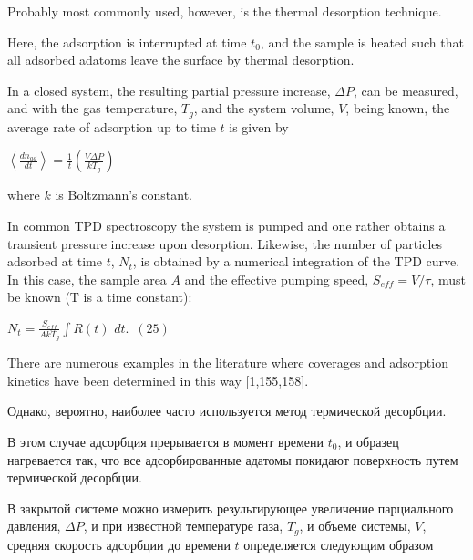 \documentclass[11pt]{article}
\makeatletter
\newcommand{\boxspacing}{\kern\kvtcb@left@rule\kern\kvtcb@boxsep}
\newcommand{\prompt}[4]{
        {\ttfamily\llap{{\color{#2}[#3]:\hspace{3pt}#4}}\vspace{-\baselineskip}}
    }
\makeatother
\begin{document}
    \begin{tcolorbox}[breakable, size=fbox, boxrule=1pt, pad at break*=1mm,colback=cellbackground, colframe=cellborder]
\prompt{In}{incolor}{ }{\boxspacing}
\begin{Verbatim}[commandchars=\\\{\}]

\end{Verbatim}
\end{tcolorbox}

    Probably most commonly used, however, is the thermal desorption
technique.

Here, the adsorption is interrupted at time \(t_0\), and the sample is
heated such that all adsorbed adatoms leave the surface by thermal
desorption.

In a closed system, the resulting partial pressure increase,
\(\Delta P\), can be measured, and with the gas temperature, \(T_g\),
and the system volume, \(V\), being known, the average rate of
adsorption up to time \(t\) is given by

\(\left<\frac{d n_{ad}}{d t}\right> = \frac{1}{t}\left(\frac{V \Delta P}{k T_g}\right)\)

where \(k\) is Boltzmann's constant.

In common TPD spectroscopy the system is pumped and one rather obtains a
transient pressure increase upon desorption. Likewise, the number of
particles adsorbed at time \(t\), \(N_t\), is obtained by a numerical
integration of the TPD curve. In this case, the sample area \(A\) and
the effective pumping speed, \(S_{eff} = V/\tau\), must be known (T is a
time constant):

\(N_t = \frac{S_{eff}}{A k T_g} \int R(t) \,\, dt. \,\,\,(25)\)

There are numerous examples in the literature where coverages and
adsorption kinetics have been determined in this way {[}1,155,158{]}.

    Однако, вероятно, наиболее часто используется метод термической
десорбции.

В этом случае адсорбция прерывается в момент времени \(t_0\), и образец
нагревается так, что все адсорбированные адатомы покидают поверхность
путем термической десорбции.

В закрытой системе можно измерить результирующее увеличение парциального
давления, \(\Delta P\), и при известной температуре газа, \(T_g\), и
объеме системы, \(V\), средняя скорость адсорбции до времени \(t\)
определяется следующим образом
\end{document}

